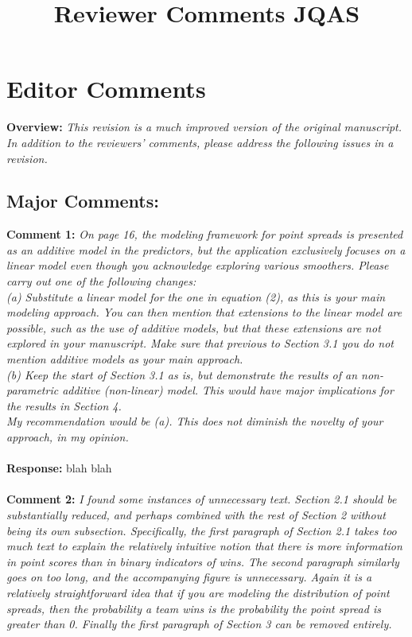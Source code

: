 \documentclass[11pt]{article} %
\title{Reviewer Comments JQAS}
\begin{document}
\maketitle


\section*{Editor Comments}
{\bf Overview:} \emph{This revision is a much improved version of the original manuscript. In addition to the reviewers' comments, please address the following issues in a revision.}
\subsection*{Major Comments:}
{\bf Comment 1: } \emph{On page 16, the modeling framework for point spreads is presented as an additive model in the predictors, but the application exclusively focuses on a linear model even though you acknowledge exploring various smoothers. Please carry out one of the following changes: \\
(a) Substitute a linear model for the one in equation (2), as this is your main modeling approach. You can then mention that extensions to the linear model are possible, such as the use of additive models, but that these extensions are not explored in your manuscript. Make sure that previous to Section 3.1 you do not mention additive models as your main approach.\\
(b) Keep the start of Section 3.1 as is, but demonstrate the results of an non-parametric additive (non-linear) model. This would have major implications for the results in Section 4.\\
My recommendation would be (a). This does not diminish the novelty of your approach, in my opinion.}\\
\\
{\bf Response:} blah blah \\
\\
{\bf Comment 2:} \emph{I found some instances of unnecessary text. Section 2.1 should be substantially reduced, and perhaps combined with the rest of Section 2 without being its own subsection. Specifically, the first paragraph of Section 2.1 takes too much text to explain the relatively intuitive notion that there is more information in point scores than in binary indicators of wins. The second paragraph similarly goes on too long, and the accompanying figure is unnecessary. Again it is a relatively straightforward idea that if you are modeling the distribution of point spreads, then the probability a team wins is the probability the point spread is greater than 0. Finally the first paragraph of Section 3 can be removed entirely.}
\end{document}
